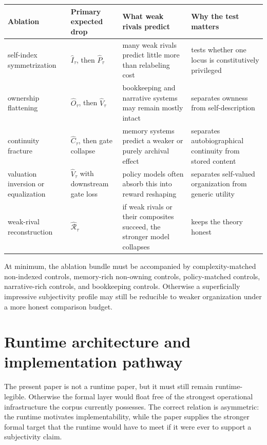 \documentclass[11pt,a4paper]{article}
\theoremstyle{definition}
\newcommand{\SelfIndex}{I}
\newcommand{\OwnField}{O}
\newcommand{\ContField}{C}
\newcommand{\Persp}{P}
\newcommand{\ValAsym}{V}
\newcommand{\Irred}{\mathcal{R}}
\begin{document}
\begin{table}[t]
\small
\begin{tabularx}{\textwidth}{@{}p{}p{}p{}Y@{}}
\toprule
\textbf{Ablation} & \textbf{Primary expected drop} & \textbf{What weak rivals predict} & \textbf{Why the test matters} \\
\midrule
self-index symmetrization & $\widehat{\SelfIndex}_\tau$, then $\widehat{\Persp}_\tau$ & many weak rivals predict little more than relabeling cost & tests whether one locus is constitutively privileged \\
ownership flattening & $\widehat{\OwnField}_\tau$, then $\widehat{\ValAsym}_\tau$ & bookkeeping and narrative systems may remain mostly intact & separates ownness from self-description \\
continuity fracture & $\widehat{\ContField}_\tau$, then gate collapse & memory systems predict a weaker or purely archival effect & separates auto\-bio\-graphical continuity from stored content \\
valuation inversion or equalization & $\widehat{\ValAsym}_\tau$ with downstream gate loss & policy models often absorb this into reward reshaping & separates self-valued organization from generic utility \\
weak-rival reconstruction & $\widehat{\Irred}_\tau$ & if weak rivals or their composites succeed, the stronger model collapses & keeps the theory honest \\
\bottomrule
\end{tabularx}
\end{table}

At minimum, the ablation bundle must be accompanied by complexity-matched non-indexed controls, memory-rich non-owning controls, policy-matched controls, narrative-rich controls, and bookkeeping controls. Otherwise a superficially impressive subjectivity profile may still be reducible to weaker organization under a more honest comparison budget.

\section{Runtime architecture and implementation pathway}
The present paper is not a runtime paper, but it must still remain runtime-legible. Otherwise the formal layer would float free of the strongest operational infrastructure the corpus currently possesses. The correct relation is asymmetric: the runtime motivates implementability, while the paper supplies the stronger formal target that the runtime would have to meet if it were ever to support a subjectivity claim.
\end{document}
